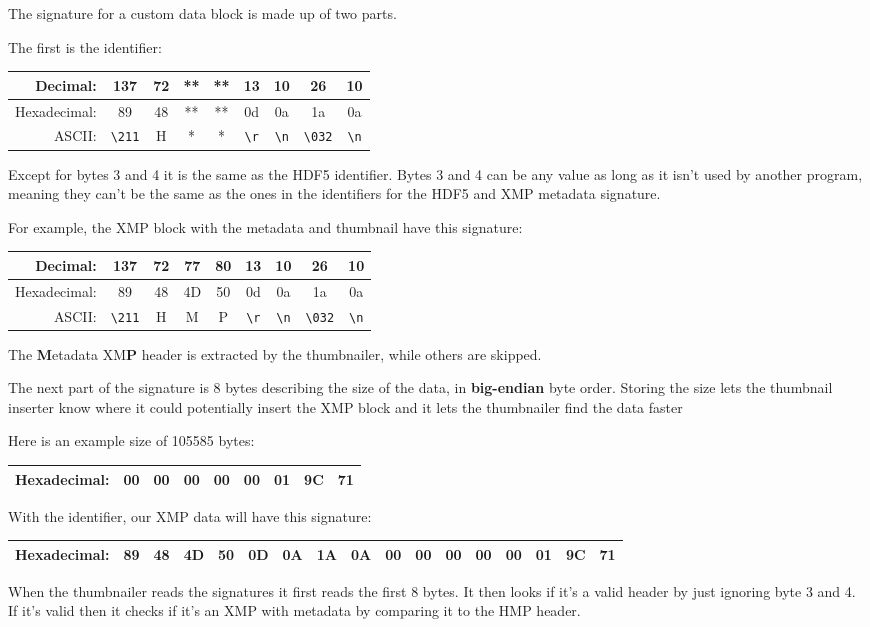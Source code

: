 The signature for a custom data block is made up of two parts.

The first is the identifier:

\begin{tabular}{ |r|c|c|c|c|c|c|c|c| }
    \hline
    Decimal:     & 137         & 72 & ** & ** & 13        & 10        & 26          & 10 \\ 
    \hline
    Hexadecimal: & 89          & 48 & ** & ** & 0d        & 0a        & 1a          & 0a \\ 
    \hline
    ASCII:       & \verb+\211+ & H  & *  & *  & \verb+\r+ & \verb+\n+ & \verb+\032+ & \verb+\n+ \\ 
    \hline
\end{tabular}

Except for bytes 3 and 4 it is the same as the HDF5 identifier.
Bytes 3 and 4 can be any value as long as it isn't used by another program, meaning they can't be the same
as the ones in the identifiers for the HDF5 and XMP metadata signature.

For example, the XMP block with the metadata and thumbnail have this signature:

\begin{tabular}{ |r|c|c|c|c|c|c|c|c| }
    \hline
    Decimal:     & 137         & 72 & 77 & 80 & 13        & 10        & 26          & 10 \\
    \hline
    Hexadecimal: & 89          & 48 & 4D & 50 & 0d        & 0a        & 1a          & 0a \\
    \hline
    ASCII:       & \verb+\211+ & H  & M  & P  & \verb+\r+ & \verb+\n+ & \verb+\032+ & \verb+\n+ \\
    \hline
\end{tabular}

The \textbf{M}etadata XM\textbf{P} header is extracted by the thumbnailer, while others are skipped.

The next part of the signature is 8 bytes describing the size of the data, in \textbf{big-endian} byte order.
Storing the size lets the thumbnail inserter know where it could potentially insert the XMP block and
it lets the thumbnailer find the data faster 

Here is an example size of 105585 bytes:

\begin{tabular}{ |r|c|c|c|c|c|c|c|c| }
    \hline
    Hexadecimal: & 00 & 00 & 00 & 00 & 00 & 01 & 9C & 71 \\
    \hline
\end{tabular}

With the identifier, our XMP data will have this signature:

\begin{tabular}{ |r|c|c|c|c|c|c|c|c|c|c|c|c|c|c|c|c| }
    \hline
    Hexadecimal: & 89 & 48 & 4D & 50 & 0D & 0A & 1A & 0A & 00 & 00 & 00 & 00 & 00 & 01 & 9C & 71 \\
    \hline
\end{tabular}

When the thumbnailer reads the signatures it first reads the first 8 bytes.
It then looks if it's a valid header by just ignoring byte 3 and 4.
If it's valid then it checks if it's an XMP with metadata by comparing it to the HMP header.